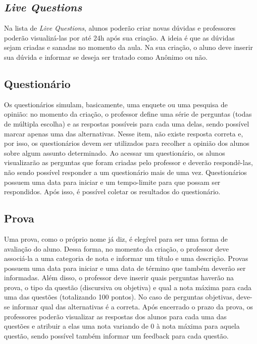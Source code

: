 \subsection{\textit{Live Questions}}
\label{sec-minimundo:itens-board:live-questions}
Na lista de \textit{Live Questions}, alunos poderão criar novas dúvidas e professores poderão visualizá-las por até 24h após sua criação. A ideia é que as dúvidas sejam criadas e sanadas no momento da aula. Na sua criação, o aluno deve inserir sua dúvida e informar se deseja ser tratado como Anônimo ou não. 

\subsection{Questionário}
\label{sec-minimundo:itens-board:questionario}
Os questionários simulam, basicamente, uma enquete ou uma pesquisa de opinião: no momento da criação, o professor define uma série de perguntas (todas de múltipla escolha) e as respostas possíveis para cada uma delas, sendo possível marcar apenas uma das alternativas. Nesse item, não existe resposta correta e, por isso, os questionários devem ser utilizados para recolher a opinião dos alunos sobre algum assunto determinado. Ao acessar um questionário, os alunos visualizarão as perguntas que foram criadas pelo professor e deverão respondê-las, não sendo possível responder a um questionário mais de uma vez.  Questionários possuem uma data para iniciar e um tempo-limite para que possam ser respondidos. Após isso, é possível coletar os resultados do questionário. 

\subsection{Prova}
\label{sec-minimundo:itens-board:prova}
Uma prova, como o próprio nome já diz, é elegível para ser uma forma de avaliação do aluno. Dessa forma, no momento da criação, o professor deve associá-la a uma categoria de nota e informar um título e uma descrição. Provas possuem uma data para iniciar e uma data de término que também deverão ser informadas. Além disso, o professor deve inserir quais perguntas haverão na prova, o tipo da questão (discursiva ou objetiva) e qual a nota máxima para cada uma das questões (totalizando 100 pontos). No caso de perguntas objetivas, deve-se informar qual das alternativas é a correta. Após encerrado o prazo da prova, os professores poderão visualizar as respostas dos alunos para cada uma das questões e atribuir a elas uma nota variando de 0 à nota máxima para aquela questão, sendo possível também informar um feedback para cada questão.


